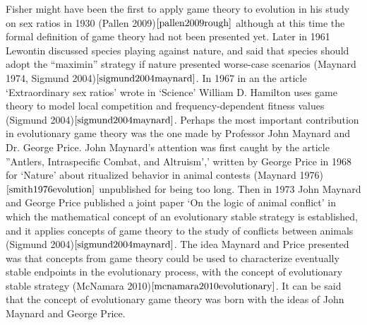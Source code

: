 \documentclass{article}
\begin{document}
Fisher might have been the first to apply game theory to evolution in his study on sex ratios in 1930 (Pallen 2009)$\cite{pallen2009rough}$ although at this time the formal definition of game theory had not been presented yet. Later in 1961 Lewontin discussed species playing against nature, and said that species should adopt the ``maximin'' strategy if nature presented worse-case scenarios (Maynard 1974, Sigmund 2004)$\cite{sigmund2004maynard}$. In 1967 in an the article ‘Extraordinary sex ratios’ wrote in ‘Science’ William D. Hamilton uses game theory to model local competition and frequency-dependent fitness values (Sigmund 2004)$\cite{sigmund2004maynard}$. Perhaps the most important contribution in evolutionary game theory was the one made by Professor John Maynard and Dr. George Price. John Maynard’s attention was first caught by the article ''Antlers, Intraspecific Combat, and Altruism',' written by George Price in 1968 for `Nature’ about ritualized behavior in animal contests (Maynard 1976)$\cite{smith1976evolution}$ unpublished for being too long. Then in 1973 John Maynard and George Price published a joint paper ‘On the logic of animal conflict’ in which the mathematical concept of an evolutionary stable strategy is established, and it applies concepts of game theory to the study of conflicts between animals (Sigmund 2004)$\cite{sigmund2004maynard}$.  The idea Maynard and Price presented was that concepts from game theory could be used to characterize eventually stable endpoints in the evolutionary process, with the concept of evolutionary stable strategy (McNamara 2010)$\cite{mcnamara2010evolutionary}$. It can be said that the concept of evolutionary game theory was born with the ideas of John Maynard and George Price.
\end{document}
